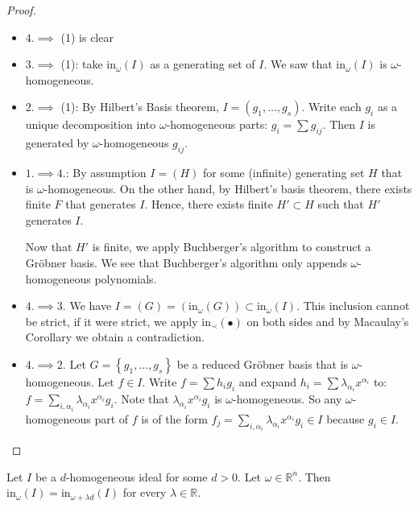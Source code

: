 \documentclass[a4paper, 11pt]{article}
\begin{document}
\begin{proof}\(  \)
  \begin{itemize}
    \item \(4. \implies \) (1) is clear
    \item  \(3. \implies \) (1): take \( \mathrm{in}_\omega(I) \) as a generating set of \( I \). We saw that \( \mathrm{in}_\omega(I) \) is \( \omega \)-homogeneous.
    \item \(2. \implies \) (1): By Hilbert's Basis theorem, \( I = (g_1, \dots, g_s) \). Write each \( g_i \) as a unique decomposition into \( \omega \)-homogeneous parts: \( g_i = \sum g_{ij} \). Then \( I \) is generated by \( \omega \)-homogeneous \( g_{ij} \).
    \item \( 1. \implies 4. \): By assumption \( I = (H) \)  for some (infinite) generating set \( H \) that is \( \omega \)-homogeneous. On the other hand, by Hilbert's basis theorem, there exists finite \( F \) that generates \( I \). Hence, there exists finite \( H' \subset H \) such that \( H' \) generates \( I \).
    
    Now that \( H' \) is finite, we apply Buchberger's algorithm to construct a Gröbner basis. We see that Buchberger's algorithm only appends \( \omega \)-homogeneous polynomials.

    \item \( 4. \implies 3. \) We have \( I = (G) = (\mathrm{in}_\omega(G)) \subset \mathrm{in}_\omega(I) \). This inclusion cannot be strict, if it were strict, we apply \( \mathrm{in}_\prec(\bullet) \) on both sides and by Macaulay's Corollary we obtain a contradiction.

    \item \( 4. \implies 2. \) Let \( G = \left\{ g_1, \dots, g_s \right\} \) be a reduced Gröbner basis that is \( \omega \)-homogeneous. Let \( f \in I \). Write \( f = \sum h_i g_i \) and expand \( h_i = \sum \lambda_{\alpha_i} x^{\alpha_i} \) to: \( f = \sum_{i, \alpha_i} \lambda_{\alpha_i} x^{\alpha_i} g_i \). Note that \( \lambda_{\alpha_i} x^{\alpha_i} g_i \) is \( \omega \)-homogeneous. So any \( \omega \)-homogeneous part of \( f \) is of the form \( f_j = \sum_{i, \alpha_i}  \lambda_{\alpha_i} x^{\alpha_i} g_i  \in I\) because \( g_i \in I \).
  \end{itemize}
\end{proof}

\begin{lemma}
  Let \( I \) be a \( d \)-homogeneous ideal for some \( d > 0 \). Let \( \omega \in \mathbb R^n \). Then \( \mathrm{in}_\omega(I) = \mathrm{in}_{\omega + \lambda d}(I) \) for every \( \lambda \in \mathbb R \).
\end{lemma}
\end{document}
